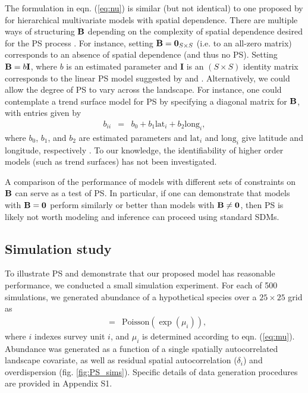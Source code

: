 \documentclass[times,mee,doublespace,]{besauth2}
\begin{document}
 The formulation in eqn. (\ref{eq:nu}) is similar (but not identical) to one proposed by \citet{RoyleBerliner1999} for hierarchical multivariate models with spatial dependence.  There are multiple ways of structuring ${\bf B}$ depending on the complexity of spatial dependence desired for the PS process \citep{RoyleBerliner1999}.  For instance, setting ${\bf B} = {\bf 0}_{S \times S}$ (i.e. to an all-zero matrix) corresponds to an absence of spatial dependence (and thus no PS).  Setting ${\bf B} = b {\bf I}$, where $b$ is an estimated parameter and {\bf I} is an $(S \times S)$ identity matrix corresponds to the linear PS model suggested by \citet{DiggleEtAl2010} and \citet{PatiEtAl2011}.  Alternatively, we could allow the degree of PS to vary across the landscape.  For instance, one could contemplate a trend surface model for PS by specifying a diagonal matrix for ${\bf B}$, with entries given by
 \begin{eqnarray*}
   \label{eq:ts}
   b_{ii} & = & b_0 + b_1 \textrm{lat}_i + b_2 \textrm{long}_i,
 \end{eqnarray*}
 where $b_0$, $b_1$, and $b_2$ are estimated parameters and $\textrm{lat}_i$ and $\textrm{long}_i$ give latitude and longitude, respectively \citep{RoyleBerliner1999}.  To our knowledge, the identifiability of higher order models (such as trend surfaces) has not been investigated.

A comparison of the performance of models with different sets of constraints on ${\bf B}$ can serve as a test of PS.  In particular, if one can demonstrate that models with ${\bf B}={\bf 0}$ perform similarly or better than models with ${\bf B} \ne {\bf 0}$, then PS is likely not worth modeling and inference can proceed using standard SDMs.


\subsection{Simulation study}

To illustrate PS and demonstrate that our proposed model has reasonable performance, we conducted a small simulation experiment.  For each of 500 simulations, we generated abundance of a hypothetical species over a $25 \times 25$ grid as
\begin{eqnarray*}
  [N_i|\mu_i] & = & \textrm{Poisson}(\exp(\mu_i)),
\end{eqnarray*}
where $i$ indexes survey unit $i$, and $\mu_i$ is determined according to eqn. (\ref{eq:mu}). Abundance was generated as a function of a single spatially autocorrelated landscape covariate, as well as residual spatial autocorrelation ($\delta_i$) and overdispersion (fig. \ref{fig:PS_sims}). Specific details of data generation procedures are provided in Appendix S1.
\end{document}
